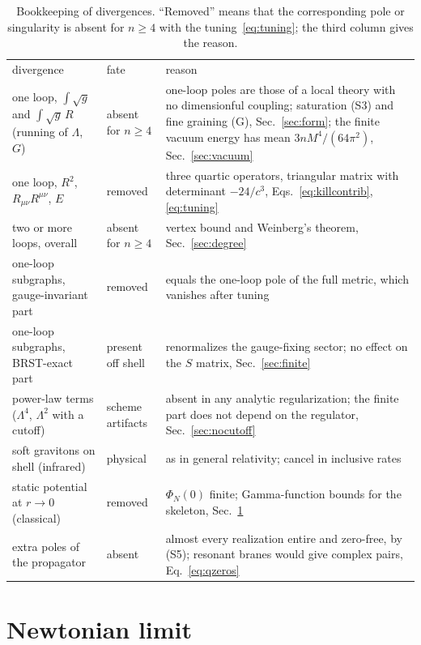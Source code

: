 \documentclass[aps,prd,10pt,twocolumn,superscriptaddress,nofootinbib,floatfix,longbibliography]{revtex4-2}
\begin{document}
\begin{table}[t]
\caption{Bookkeeping of divergences. ``Removed'' means that the corresponding pole or singularity is absent for $n\ge4$ with the tuning~\eqref{eq:tuning}; the third column gives the reason.}
\label{tab:divergences}
\begin{ruledtabular}
\begin{tabular}{p{4.6cm}p{2.5cm}p{9.6cm}}
divergence & fate & reason\\
\colrule
one loop, $\int\sqrt g$ and $\int\sqrt g\,R$ (running of $\Lambda$, $G$) & absent for $n\ge4$ & one-loop poles are those of a local theory with no dimensionful coupling; saturation (S3) and fine graining (G), Sec.~\ref{sec:form}; the finite vacuum energy has mean $3nM^4/(64\pi^2)$, Sec.~\ref{sec:vacuum}\\
one loop, $R^2$, $R_{\mu\nu}R^{\mu\nu}$, $E$ & removed & three quartic operators, triangular matrix with determinant $-24/c^3$, Eqs.~\eqref{eq:killcontrib}, \eqref{eq:tuning}\\
two or more loops, overall & absent for $n\ge4$ & vertex bound and Weinberg's theorem, Sec.~\ref{sec:degree}\\
one-loop subgraphs, gauge-invariant part & removed & equals the one-loop pole of the full metric, which vanishes after tuning\\
one-loop subgraphs, BRST-exact part & present off shell & renormalizes the gauge-fixing sector; no effect on the $S$ matrix, Sec.~\ref{sec:finite}\\
power-law terms ($\Lambda^4$, $\Lambda^2$ with a cutoff) & scheme artifacts & absent in any analytic regularization; the finite part does not depend on the regulator, Sec.~\ref{sec:nocutoff}\\
soft gravitons on shell (infrared) & physical & as in general relativity; cancel in inclusive rates~\cite{Weinberg1965}\\
static potential at $r\to0$ (classical) & removed & $\Phi_N(0)$ finite; Gamma-function bounds for the skeleton, Sec.~\ref{sec:classical}\\
extra poles of the propagator & absent & almost every realization entire and zero-free, by (S5); resonant branes would give complex pairs, Eq.~\eqref{eq:qzeros}\\
\end{tabular}
\end{ruledtabular}
\end{table}


\section{Newtonian limit}
\label{sec:classical}
\end{document}
